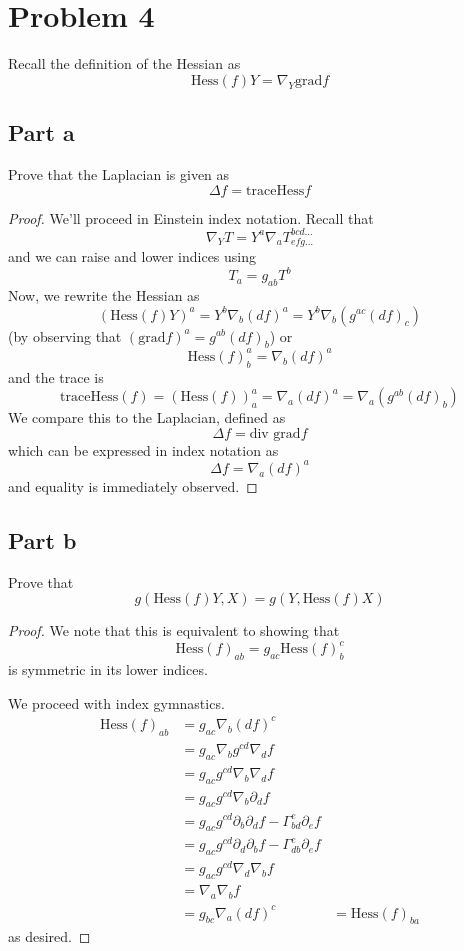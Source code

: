 \documentclass[fontsize=11pt]{scrartcl} %
\numberwithin{equation}{section} %
\numberwithin{figure}{section} %
\numberwithin{table}{section} %
\newcommand{\Hess}{\text{Hess}}
\newcommand{\tr}{\text{trace}}
\begin{document}
\newpage

\section*{Problem 4}
Recall the definition of the Hessian as
\[
    \Hess(f)Y = \nabla_Y\text{grad}f
\]
\subsection*{Part a}
Prove that the Laplacian is given as
\[
    \Delta f = \tr \Hess f
\]

\begin{proof}
    We'll proceed in Einstein index notation. Recall that
    \[
        \nabla_YT = Y^a\nabla_aT^{bcd\dots}_{efg\dots}
    \]
    and we can raise and lower indices using
    \[
        T_a = g_{ab}T^b
    \]
    Now, we rewrite the Hessian as
    \[
        (\Hess(f)Y)^a = Y^b\nabla_b(df)^a = Y^b\nabla_b(g^{ac}(df)_c)
    \]
    (by observing that $(\text{grad}f)^a = g^{ab}(df)_b$)
    or
    \[
        \Hess(f)^a_b = \nabla_b(df)^a
    \]
    and the trace is
    \[
        \tr\Hess(f) = (\Hess(f))^a_a = \nabla_a(df)^a = \nabla_a(g^{ab}(df)_b)
    \]
    We compare this to the Laplacian, defined as
    \[
        \Delta f = \text{div grad}f
    \]
    which can be expressed in index notation as
    \[
        \Delta f = \nabla_a(df)^a
    \]
    and equality is immediately observed.

\end{proof}

\subsection*{Part b}
Prove that
\[
    g(\Hess(f)Y,X) = g(Y,\Hess(f)X)
\]
\begin{proof}
    We note that this is equivalent to showing that
    \[
        \Hess(f)_{ab} = g_{ac}\Hess(f)^c_b
    \]
    is symmetric in its lower indices.

    We proceed with index gymnastics.
    \[
        \begin{aligned}
            \Hess(f)_{ab} &= g_{ac}\nabla_b(df)^c\\
            &= g_{ac}\nabla_bg^{cd}\nabla_df\\
            &= g_{ac}g^{cd}\nabla_b\nabla_df\\
            &= g_{ac}g^{cd}\nabla_b\partial_df\\
            &= g_{ac}g^{cd}\partial_b\partial_df - \Gamma^e_{bd}\partial_ef\\
            &= g_{ac}g^{cd}\partial_d\partial_bf - \Gamma^e_{db}\partial_ef\\
            &= g_{ac}g^{cd}\nabla_d\nabla_bf\\
            &= \nabla_a\nabla_bf\\
            &= g_{bc}\nabla_a(df)^c
            &=\Hess(f)_{ba}
    \end{aligned}
    \]
    as desired.
\end{proof}
\end{document}
